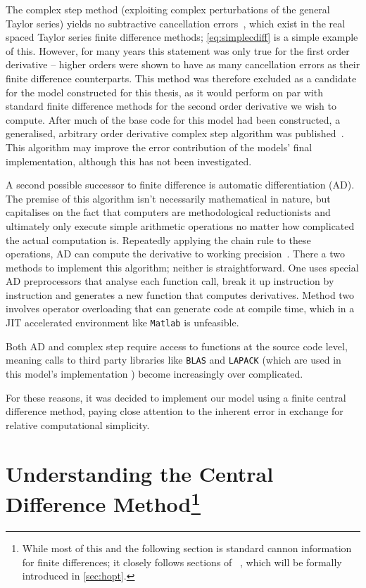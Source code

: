The complex step method (exploiting complex perturbations of the general Taylor series) yields no subtractive cancellation errors~\cite{Squire1998}, which exist in the real spaced Taylor series finite difference methods; \cref{eq:simplecdiff} is a simple example of this.
However, for many years this statement was only true for the first order derivative -- higher orders were shown to have as many cancellation errors as their finite difference counterparts.
This method was therefore excluded as a candidate for the model constructed for this thesis, as it would perform on par with standard finite difference methods for the second order derivative we wish to compute.
After much of the base code for this model had been constructed, a generalised, arbitrary order derivative complex step algorithm was published~\cite{Lantoine2012}.
This algorithm may improve the error contribution of the models' final implementation, although this has not been investigated.

A second possible successor to finite difference is automatic differentiation (AD).
The premise of this algorithm isn't necessarily mathematical in nature, but capitalises on the fact that computers are methodological reductionists and ultimately only execute simple arithmetic operations no matter how complicated the actual computation is.
Repeatedly applying the chain rule to these operations, AD can compute the derivative to working precision~\cite{Kedem1980}.
There a two methods to implement this algorithm; neither is straightforward.
One uses special AD preprocessors that analyse each function call, break it up instruction by instruction and generates a new function that computes derivatives.
Method two involves operator overloading that can generate code at compile time, which in a JIT accelerated environment like \texttt{Matlab} is unfeasible.

Both AD and complex step require access to functions at the source code level, meaning calls to third party libraries like \texttt{BLAS} and \texttt{LAPACK} (which are used in this model's implementation ) become increasingly over complicated.

For these reasons, it was decided to implement our model using a finite central difference method, paying close attention to the inherent error in exchange for relative computational simplicity.

\section[Understanding Central Differences]{Understanding the Central Difference Method\footnote{While most of this and the following section is standard cannon information for finite differences; it closely follows sections of \citeauthor{Mathur2012}~\cite{Mathur2012}, which will be formally introduced in \cref{sec:hopt}.}}\label{sec:ucdiff}

